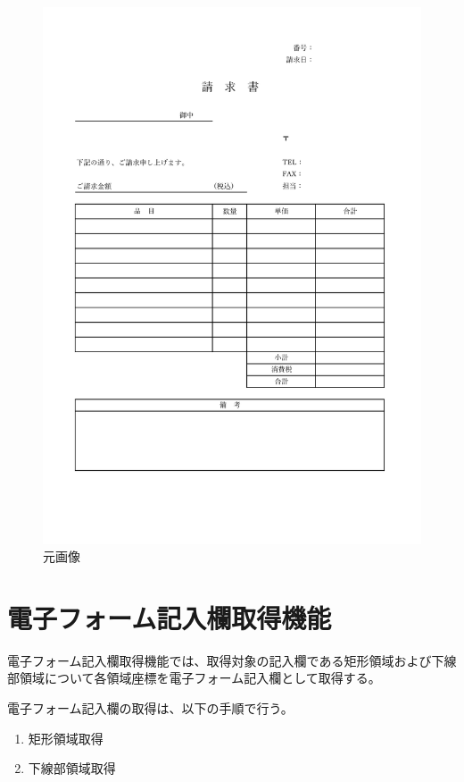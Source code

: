 \begin{figure}[t]
  \begin{center}
      \includegraphics[width=15cm]{image/03-function/original.jpg}
      \caption{元画像}
      \label{fig:original}
  \end{center}
\end{figure}


\section{電子フォーム記入欄取得機能}\label{sec:eform_write_space_obtainment_feature}
電子フォーム記入欄取得機能では、取得対象の記入欄である矩形領域および下線部領域について各領域座標を電子フォーム記入欄として取得する。

電子フォーム記入欄の取得は、以下の手順で行う。

\begin{enumerate}
  \item 矩形領域取得
  \item 下線部領域取得
\end{enumerate}

